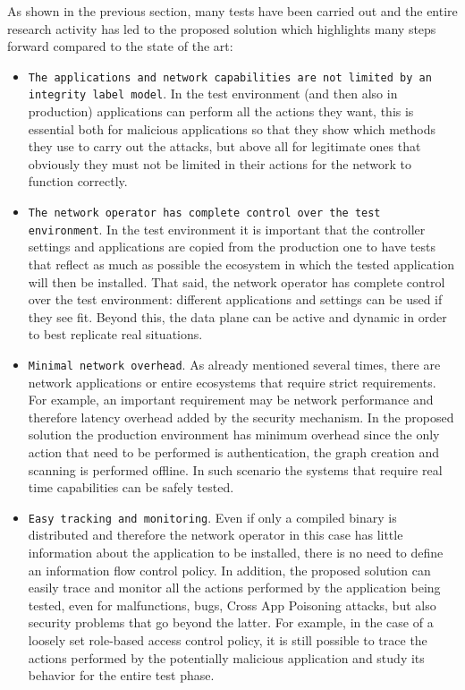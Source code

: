 {%
As shown in the previous section, many tests have been carried out and the entire research activity has led to the proposed solution which highlights many steps forward compared to the state of the art:
\begin{itemize}
    \item \texttt{The applications and network capabilities are not limited by an integrity label model}. In the test environment (and then also in production) applications can perform all the actions they want, this is essential both for malicious applications so that they show which methods they use to carry out the attacks, but above all for legitimate ones that obviously they must not be limited in their actions for the network to function correctly.
    \item \texttt{The network operator has complete control over the test environment}. In the test environment it is important that the controller settings and applications are copied from the production one to have tests that reflect as much as possible the ecosystem in which the tested application will then be installed. That said, the network operator has complete control over the test environment: different applications and settings can be used if they see fit. Beyond this, the data plane can be active and dynamic in order to best replicate real situations.
    \item \texttt{Minimal network overhead}. As already mentioned several times, there are network applications or entire ecosystems that require strict requirements. For example, an important requirement may be network performance and therefore latency overhead added by the security mechanism. In the proposed solution the production environment has minimum overhead since the only action that need to be performed is authentication, the graph creation and scanning is performed offline. In such scenario the systems that require real time capabilities can be safely tested.
    \item \texttt{Easy tracking and monitoring}. Even if only a compiled binary is distributed and therefore the network operator in this case has little information about the application to be installed, there is no need to define an information flow control policy. In addition, the proposed solution can easily trace and monitor all the actions performed by the application being tested, even for malfunctions, bugs, Cross App Poisoning attacks, but also security problems that go beyond the latter. For example, in the case of a loosely set role-based access control policy, it is still possible to trace the actions performed by the potentially malicious application and study its behavior for the entire test phase.
\end{itemize}

}
